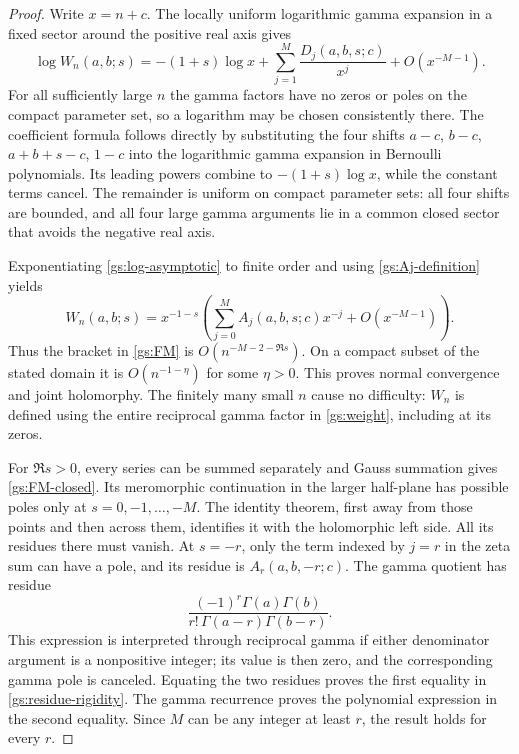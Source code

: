 \begin{proof}
Write $x=n+c$.  The locally uniform logarithmic gamma expansion in a
fixed sector around the positive real axis gives
\begin{equation}\label{gs:log-asymptotic}
 \log W_n(a,b;s)
 =-(1+s)\log x+\sum_{j=1}^M\frac{D_j(a,b,s;c)}{x^j}
   +O(x^{-M-1}).
\end{equation}
For all sufficiently large $n$ the gamma factors have no zeros or poles
on the compact parameter set, so a logarithm may be chosen consistently
there.  The coefficient formula follows directly by substituting the
four shifts $a-c$, $b-c$, $a+b+s-c$, $1-c$ into the logarithmic gamma
expansion in Bernoulli polynomials.  Its leading powers combine to
$-(1+s)\log x$, while the constant terms cancel.
The remainder is uniform on compact parameter sets: all four shifts
are bounded, and all four large gamma arguments lie in a common closed
sector that avoids the negative real axis.

Exponentiating \eqref{gs:log-asymptotic} to finite order and using
\eqref{gs:Aj-definition} yields
\[
 W_n(a,b;s)=x^{-1-s}
 \left(\sum_{j=0}^M A_j(a,b,s;c)x^{-j}+O(x^{-M-1})\right).
\]
Thus the bracket in \eqref{gs:FM} is
$O(n^{-M-2-\Re s})$.  On a compact subset of the stated domain it is
$O(n^{-1-\eta})$ for some $\eta>0$.  This proves normal convergence and
joint holomorphy.  The finitely many small $n$ cause no difficulty:
$W_n$ is defined using the entire reciprocal gamma factor in
\eqref{gs:weight}, including at its zeros.

For $\Re s>0$, every series can be summed separately and Gauss
summation gives \eqref{gs:FM-closed}.  Its meromorphic continuation in
the larger half-plane has possible poles only at $s=0,-1,\ldots,-M$.
The identity theorem, first away from those points and then across
them, identifies it with the holomorphic left side.  All its residues
there must vanish.  At $s=-r$, only the term indexed by $j=r$ in the
zeta sum can have a pole, and its residue is $A_r(a,b,-r;c)$.
The gamma quotient has residue
\[
 \frac{(-1)^r\Gamma(a)\Gamma(b)}
 {r!\,\Gamma(a-r)\Gamma(b-r)}.
\]
This expression is interpreted through reciprocal gamma if either
denominator argument is a nonpositive integer; its value is then zero,
and the corresponding gamma pole is canceled.  Equating the two
residues proves the first equality in \eqref{gs:residue-rigidity}.
The gamma recurrence proves the polynomial expression in the second
equality.  Since $M$ can be any integer at least $r$, the result holds
for every $r$.
\end{proof}

